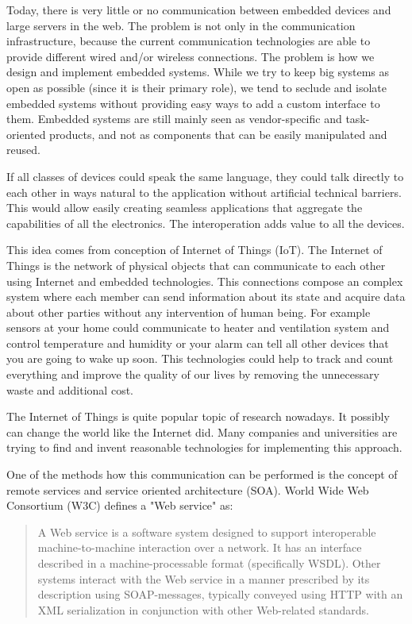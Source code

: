 Today, there is very little or no communication between embedded devices and large servers in the web.
The problem is not only in the communication infrastructure, because the current communication technologies are able to provide different wired and/or wireless connections.
The problem is how we design and implement embedded systems. While we
try to keep big systems as open as possible (since it is their primary role), we tend to seclude and isolate embedded systems without providing easy ways to add a
custom interface to them. Embedded systems are still mainly seen as vendor-specific and task-oriented products, and not as components that can be easily manipulated and reused.

If all classes of devices could speak the same language, they could 
talk directly to each other in ways natural to the application without artificial technical barriers. This would allow easily 
creating seamless applications that aggregate the capabilities of all 
the electronics. The interoperation adds value to all the devices.

This idea comes from conception of Internet of Things (IoT). The Internet of
Things is the network of physical objects that can communicate to each other
using Internet and embedded technologies. This
connections compose an complex system where each member can send information
about its state and acquire data about other parties without any intervention of
human being.
For example sensors at your home could communicate to heater
and ventilation system and control temperature and humidity or your alarm can
tell all other devices that you are going to wake up soon. 
This technologies could help to track and count everything and improve the
quality of our lives by removing the unnecessary waste and additional cost.


The Internet of Things is quite popular topic of research nowadays. It possibly
can change the world like the Internet did. Many companies and universities are
trying to find and invent reasonable technologies for implementing this approach.

One of the methods how this communication can be performed is the concept of
remote services and service oriented architecture (SOA).
World Wide Web Consortium (W3C) defines a "Web service" as: 
\begin{quote}
A Web service is a software system designed to support interoperable machine-to-machine interaction over a network.
It has an interface described in a machine-processable format (specifically
\gls{WSDL}).
Other systems interact with the Web service in a manner prescribed by its
description using \gls{SOAP}-messages, typically conveyed using \gls{HTTP} with
an \gls{XML} serialization in conjunction with other Web-related standards.
\end{quote}

